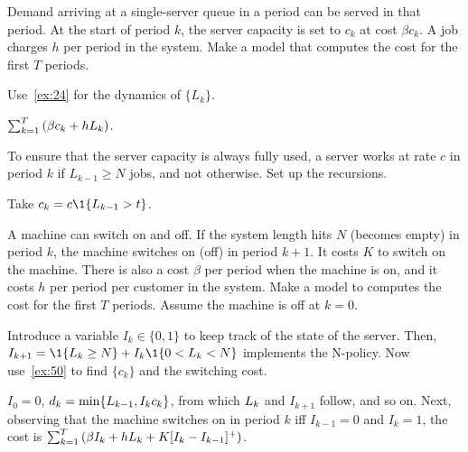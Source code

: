 \begin{exercise}\label{ex:l-116}
Demand 
arriving at a single-server queue in a period can be served in that period.
At the start of  period $k$, the server capacity is set to $c_k$ at cost $\beta c_k$. 
A job charges $h$ per period in the  system.
Make a  model that computes the cost for the first $T$ periods. 
\begin{hint}
  Use~\cref{ex:24} for the dynamics of $\{L_k\}$. 
\end{hint}
\begin{solution} $\sum_{k=1}^T \left(\beta c_k + h L_k\right)$.
\end{solution}
\end{exercise}


\begin{exercise}\label{ex:50}
To ensure that the server capacity is always fully used, 
a server  works at rate $c$ in period $k$  if $L_{k-1}\geq N$ jobs, and not otherwise.
Set up the recursions.
\begin{solution}
Take $c_k = c\1{\L_{k-1} > t}$.
\end{solution}
\end{exercise}


\begin{exercise}\label{ex:n-policies}
A machine  can switch on and off.
 If the system length hits $N$ (becomes empty) in period $k$, the machine switches on (off) in period $k+1$.
 It costs $K$ to switch on the machine.
 There is also a cost $\beta$ per period when the machine is on, and it costs $h$ per period per customer in the system.
Make a  model to  computes the cost for the first $T$ periods.
Assume the machine is  off at $k=0$.
\begin{hint}
  Introduce a variable $I_k\in\{0, 1\}$ to keep track of the state of the server.
  Then, $I_{k+1} = \1{\L_k\geq N} + I_k \1{0<\L_k<N}$ implements the N-policy.
  Now use~\cref{ex:50} to find $\{c_k\}$ and the switching cost.
\end{hint}
\begin{solution}
$I_0 = 0$,  $d_k =\min\{L_{k-1}, I_k c_k\}$, from which
$L_k$ and $I_{k+1}$ follow, and so on. Next, 
 observing that the machine  switches on in period $k$ iff
$I_{k-1} = 0$ and $I_k=1$, the cost is $\sum_{k=1}^T \left(\beta I_k + h L_k + K[I_k - I_{k-1}]^+\right)$.
\end{solution}
\end{exercise}


